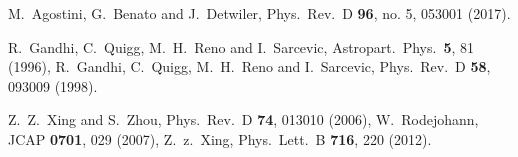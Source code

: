 \documentclass[11pt]{article}
\providecommand{\xlink}[1]
  {\href{http://arxiv.org/abs/#1}{arXiv:#1}}
\begin{document}
\begin{thebibliography}{9}
  M.~Agostini, G.~Benato and J.~Detwiler,
  Phys.\ Rev.\ D {\bf 96}, no. 5, 053001 (2017).
  
  
  
  
R.~Gandhi, C.~Quigg, M.~H.~Reno and I.~Sarcevic,
  Astropart.\ Phys.\  {\bf 5}, 81 (1996),
  R.~Gandhi, C.~Quigg, M.~H.~Reno and I.~Sarcevic,
  Phys.\ Rev.\ D {\bf 58}, 093009 (1998).
  
Z.~Z.~Xing and S.~Zhou,
Phys.\ Rev.\ D {\bf 74}, 013010 (2006),
  W.~Rodejohann,
  JCAP {\bf 0701}, 029 (2007),
  Z.~z.~Xing,
  Phys.\ Lett.\ B {\bf 716}, 220 (2012).
  

\end{thebibliography}
\end{document}
